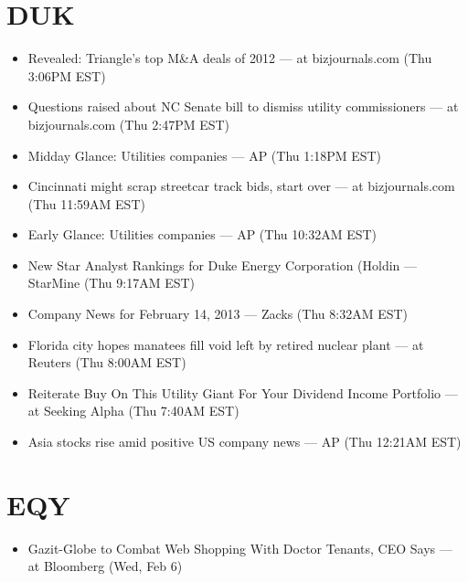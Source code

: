 \documentclass[11pt,asymmetric]{article}
\begin{document}
\section*{DUK}
\begin{itemize}
\item Revealed: Triangle's top M\&A deals of 2012 --- at bizjournals.com (Thu 3:06PM EST)
\item Questions raised about NC Senate bill to dismiss utility commissioners --- at bizjournals.com (Thu 2:47PM EST)
\item Midday Glance: Utilities companies --- AP (Thu 1:18PM EST)
\item Cincinnati might scrap streetcar track bids, start over --- at bizjournals.com (Thu 11:59AM EST)
\item Early Glance: Utilities companies --- AP (Thu 10:32AM EST)
\item New Star Analyst Rankings for Duke Energy Corporation (Holdin --- StarMine (Thu 9:17AM EST)
\item Company News for February 14, 2013 --- Zacks (Thu 8:32AM EST)
\item Florida city hopes manatees fill void left by retired nuclear plant --- at Reuters (Thu 8:00AM EST)
\item Reiterate Buy On This Utility Giant For Your Dividend Income Portfolio --- at Seeking Alpha (Thu 7:40AM EST)
\item Asia stocks rise amid positive US company news --- AP (Thu 12:21AM EST)
\end{itemize}

\section*{EQY}
\begin{itemize}
\item Gazit-Globe to Combat Web Shopping With Doctor Tenants, CEO Says --- at Bloomberg (Wed, Feb 6)
\end{itemize}
\end{document}
